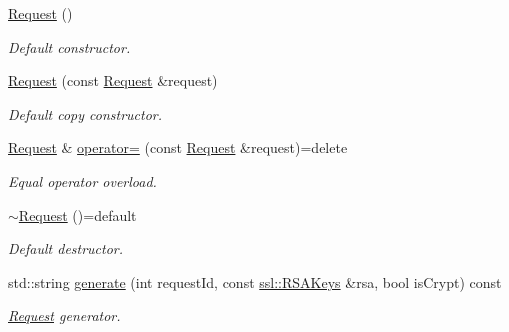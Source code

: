 \begin{DoxyCompactItemize}
\item 
\mbox{\label{class_spider_1_1_event_1_1_request_ad141d09686cf9cdb1ecb9eba82b2710b}} 
\hyperlink{class_spider_1_1_event_1_1_request_ad141d09686cf9cdb1ecb9eba82b2710b}{Request} ()
\begin{DoxyCompactList}\small\item\em Default constructor. \end{DoxyCompactList}\item 
\mbox{\label{class_spider_1_1_event_1_1_request_a65c49a1885b979b125adcbad72ab73ee}} 
\hyperlink{class_spider_1_1_event_1_1_request_a65c49a1885b979b125adcbad72ab73ee}{Request} (const \hyperlink{class_spider_1_1_event_1_1_request}{Request} \&request)
\begin{DoxyCompactList}\small\item\em Default copy constructor. \end{DoxyCompactList}\item 
\mbox{\label{class_spider_1_1_event_1_1_request_aa6c13b33959dc082e00b9c872d41c84d}} 
\hyperlink{class_spider_1_1_event_1_1_request}{Request} \& \hyperlink{class_spider_1_1_event_1_1_request_aa6c13b33959dc082e00b9c872d41c84d}{operator=} (const \hyperlink{class_spider_1_1_event_1_1_request}{Request} \&request)=delete
\begin{DoxyCompactList}\small\item\em Equal operator overload. \end{DoxyCompactList}\item 
\mbox{\label{class_spider_1_1_event_1_1_request_a7da7773ecc691187761673918cd7def2}} 
\hyperlink{class_spider_1_1_event_1_1_request_a7da7773ecc691187761673918cd7def2}{$\sim$\+Request} ()=default
\begin{DoxyCompactList}\small\item\em Default destructor. \end{DoxyCompactList}\item 
std\+::string \hyperlink{class_spider_1_1_event_1_1_request_adf63bc8d31f15530f110227b8827aabd}{generate} (int request\+Id, const \hyperlink{class_spider_1_1ssl_1_1_r_s_a_keys}{ssl\+::\+R\+S\+A\+Keys} \&rsa, bool is\+Crypt) const
\begin{DoxyCompactList}\small\item\em \hyperlink{class_spider_1_1_event_1_1_request}{Request} generator. \end{DoxyCompactList}\end{DoxyCompactItemize}

